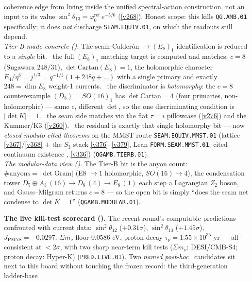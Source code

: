 \documentclass[11pt,a4paper]{article}
\newcommand{\phiz}{\varphi_0^{\mathrm{ret}}}
\begin{document}
\begin{keybox}
coherence edge from living inside the unified spectral-action construction, not an input to its value
$\sin^2\theta_{13}=\phiz\,e^{-5/6}$ (\vref{v268}). Honest scope: this kills \texttt{QG.AMB.01}
specifically; it does \emph{not} discharge \texttt{SEAM.EQUIV.01}, on which the readouts still depend.
\smallskip\\
\noindent\emph{Tier B made concrete ().} The
seam-Calder\'on $\to(E_8)_1$ identification is reduced to a \emph{single} bit. \mE\ the full $(E_8)_1$ matching
target is computed and matches: $c{=}8$ (Sugawara $248/31$), $\det\mathrm{Cartan}(E_8){=}1$, the holomorphic
character $E_4/\eta^8{=}j^{1/3}{=}q^{-1/3}(1{+}248q{+}\dots)$ with a single primary and exactly $248{=}\dim E_8$
weight-1 currents. \mE\ the discriminator is \emph{holomorphy}: the $c{=}8$ counterexample
$(D_8){=}SO(16)_1$ has $\det\mathrm{Cartan}{=}4$ (four primaries, non-holomorphic) --- same $c$, different
$\det$, so the one discriminating condition is $|\det K|{=}1$. \mC\ the seam side matches via the flat
$\tau{=}i$ pillowcase (\vref{v276}) and the Kummer/K3 (\vref{v260}). \mC\ the residual is exactly that single
holomorphy bit --- now \emph{closed modulo cited theorems} on the MMST route \texttt{SEAM.EQUIV.MMST.01}
(lattice \vref{v367}/\vref{v368} $+$ the $S_3$ stack
\vref{v376}--\vref{v379}, Lean \texttt{FORM.SEAM.MMST.01}; cited continuum existence \mO, \vref{v336})
(\texttt{QGAMB.TIERB.01}).
\smallskip\\
\noindent\emph{The modular-data view ().} The Tier-B bit is the
anyon count: $\#\text{anyons}=|\det\mathrm{Gram}|$ (E8 $\to1$ holomorphic, $SO(16)\to4$), the
condensation tower $D_5{\oplus}A_3\,(16)\to D_8\,(4)\to E_8\,(1)$ each step a Lagrangian $Z_2$ boson, and
Gauss--Milgram returns $c{=}8$ --- so the open bit is simply ``does the seam net condense to $\det K{=}1$''
(\texttt{QGAMB.MODULAR.01}).
\par\smallskip\noindent\textbf{The live kill-test scorecard ().} The
recent round's computable predictions confronted with current data: $\sin^2\theta_{12}$ ($+0.31\sigma$),
$\sin^2\theta_{13}$ ($+1.45\sigma$), $J_{\mathrm{PMNS}}{=}{-}0.0297$, $\Sigma m_\nu$ floor $0.0586$ eV,
proton decay $\tau_p{=}1.55{\times}10^{35}$ yr --- all consistent at $<2\sigma$, with two sharp near-term kill
tests ($\Sigma m_\nu$: DESI/CMB-S4; proton decay: Hyper-K) (\texttt{PRED.LIVE.01}). Two \emph{named post-hoc}
\mO\ candidates sit next to this board without touching the frozen record: the third-generation ladder-base

\end{keybox}
\end{document}
